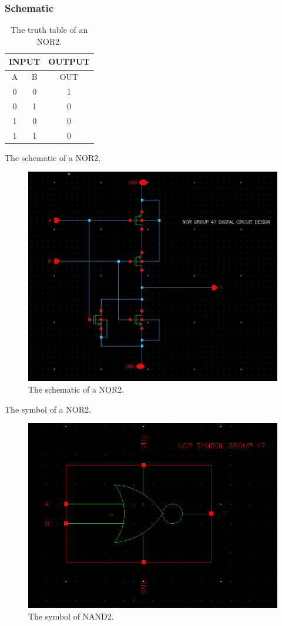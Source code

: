\subsubsection{Schematic}

\begin{table}[H]
	\centering
	\begin{tabular}{|c|c|c|}
		\hline
		\multicolumn{2}{|c|}{INPUT} & OUTPUT \\
		\hline
		A & B  & OUT\\
		\hline
		0 & 0 & 1 \\
		\hline
		0 & 1 & 0\\
		\hline
		1 & 0 & 0\\
		\hline
		1 & 1 & 0\\
		\hline
	\end{tabular}
	\caption{The truth table of an NOR2.}
	\label{t_the truth table of NOR2}
\end{table}

The schematic of a NOR2.

\begin{figure}[H]
	\centering
	\includegraphics[width=.6\linewidth]{section/EX1/NOR/EX1_NOR2_schematic.png}
	\caption{The schematic of a NOR2.}
	\label{f_EX1_NOR2_schematic}
\end{figure} 

The symbol of a NOR2.

\begin{figure}[H]
	\centering
	\includegraphics[width=.6\linewidth]{section/EX1/NOR/EX1_NOR2_symbol.png}
	\caption{The symbol of NAND2.}
	\label{f_EX1_NOR2_symbol}
\end{figure}


